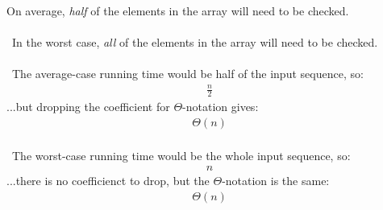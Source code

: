 On average, \textit{half} of the elements in the array will need to be checked.
\\ \\
\noindent~In the worst case, \textit{all} of the elements in the array will need to be checked.
\\ \\
\noindent~The average-case running time would be half of the input sequence, so:
\begin{eqnarray*}
	\frac{n}{2}
\end{eqnarray*}
...but dropping the coefficient for $\Theta$-notation gives:
\begin{eqnarray*}
	\Theta(n)
\end{eqnarray*}
\\
\noindent~The worst-case running time would be the whole input sequence, so:
\begin{eqnarray*}
	n
\end{eqnarray*}
...there is no coefficienct to drop, but the $\Theta$-notation is the same:
\begin{eqnarray*}
	\Theta(n)
\end{eqnarray*}
